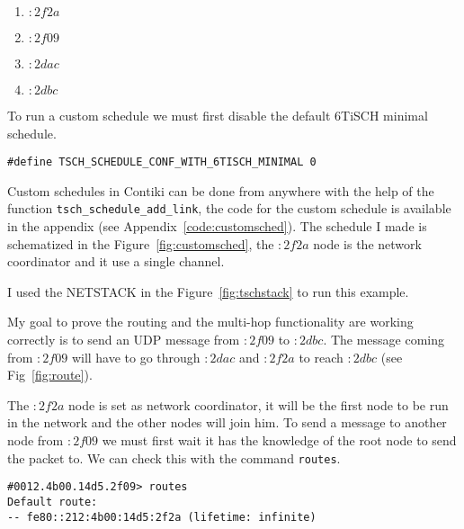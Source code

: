 \begin{enumerate}
  \item $:2f2a$
  \item $:2f09$
  \item $:2dac$
  \item $:2dbc$
\end{enumerate}

To run a custom schedule we must first disable the default 6TiSCH minimal schedule.

\begin{lstlisting}
#define TSCH_SCHEDULE_CONF_WITH_6TISCH_MINIMAL 0
\end{lstlisting}

Custom schedules in Contiki can be done from anywhere with the help of the
function \lstinline{tsch_schedule_add_link}, the code for the custom schedule
is available in the appendix (see Appendix~\ref{code:customsched}).
The schedule I made is schematized in the Figure~\ref{fig:customsched}, the $:2f2a$ 
node is the network coordinator and it use a single channel.



I used the NETSTACK in the Figure~\ref{fig:tschstack} to run this example.



My goal to prove the routing and the multi-hop functionality are working
correctly is to send an UDP message from $:2f09$ to $:2dbc$.
The message coming from $:2f09$ will have to go through $:2dac$ and $:2f2a$ to
reach $:2dbc$ (see Fig~\ref{fig:route}).





The $:2f2a$ node is set as network coordinator, it will be the first node to be
run in the network and the other nodes will join him.
To send a message to another node from $:2f09$ we must first wait it has
the knowledge of the root node to send the packet to.
We can check this with the command \lstinline{routes}.

\begin{lstlisting}[language=none]
#0012.4b00.14d5.2f09> routes
Default route:
-- fe80::212:4b00:14d5:2f2a (lifetime: infinite)
\end{lstlisting}

